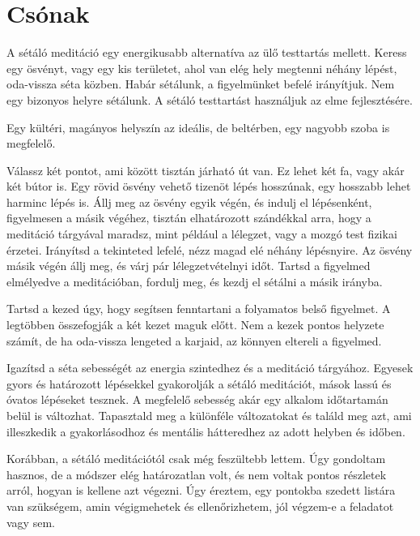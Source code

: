 \chapter{Csónak}


\noindent A sétáló meditáció egy energikusabb alternatíva az ülő
testtartás mellett. Keress egy ösvényt, vagy egy kis területet, ahol van
elég hely megtenni néhány lépést, oda-vissza séta közben. Habár
sétálunk, a figyelmünket befelé irányítjuk. Nem egy bizonyos helyre
sétálunk. A sétáló testtartást használjuk az elme fejlesztésére.

Egy kültéri, magányos helyszín az ideális, de beltérben, egy nagyobb
szoba is megfelelő.

Válassz két pontot, ami között tisztán járható út van. Ez lehet két fa,
vagy akár két bútor is. Egy rövid ösvény vehető tizenöt lépés hosszúnak,
egy hosszabb lehet harminc lépés is. Állj meg az ösvény egyik végén, és
indulj el lépésenként, figyelmesen a másik végéhez, tisztán elhatározott
szándékkal arra, hogy a meditáció tárgyával maradsz, mint például a
lélegzet, vagy a mozgó test fizikai érzetei. Irányítsd a tekinteted
lefelé, nézz magad elé néhány lépésnyire. Az ösvény másik végén állj
meg, és várj pár lélegzetvételnyi időt. Tartsd a figyelmed elmélyedve a
meditációban, fordulj meg, és kezdj el sétálni a másik irányba.

Tartsd a kezed úgy, hogy segítsen fenntartani a folyamatos belső
figyelmet. A legtöbben összefogják a két kezet maguk előtt. Nem a kezek
pontos helyzete számít, de ha oda-vissza lengeted a karjaid, az könnyen
eltereli a figyelmed.

\clearpage
\thispagestyle{empty}\mbox{}
\clearpage

Igazítsd a séta sebességét az energia szintedhez és a meditáció
tárgyához. Egyesek gyors és határozott lépésekkel gyakorolják a sétáló
meditációt, mások lassú és óvatos lépéseket tesznek. A megfelelő
sebesség akár egy alkalom időtartamán belül is változhat. Tapasztald meg
a különféle változatokat és találd meg azt, ami illeszkedik a
gyakorlásodhoz és mentális hátteredhez az adott helyben és időben.


Korábban, a sétáló meditációtól csak még feszültebb lettem. Úgy
gondoltam hasznos, de a módszer elég határozatlan volt, és nem voltak
pontos részletek arról, hogyan is kellene azt végezni. Úgy éreztem, egy
pontokba szedett listára van szükségem, amin végigmehetek és
ellenőrizhetem, jól végzem-e a feladatot vagy sem.

